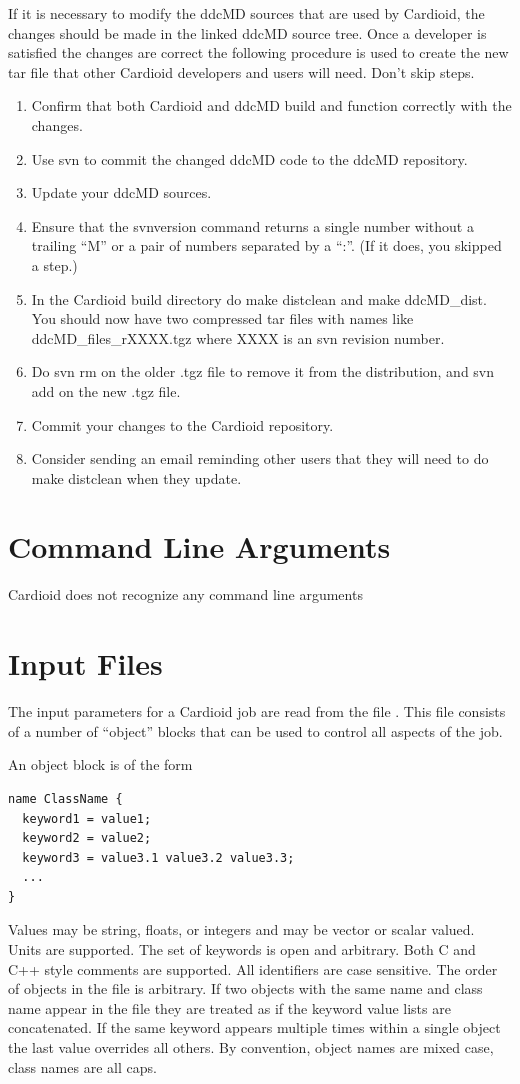 \documentclass{article}
\begin{document}
If it is necessary to modify the ddcMD sources that are used by
Cardioid, the changes should be made in the linked ddcMD source tree.
Once a developer is satisfied the changes are correct the following
procedure is used to create the new tar file that other Cardioid
developers and users will need.  Don't skip steps.
\begin{enumerate}
\item Confirm that both Cardioid and ddcMD build and function correctly
  with the changes.
\item Use svn to commit the changed ddcMD code to the ddcMD repository.
\item Update your ddcMD sources.  
\item Ensure that the svnversion command returns a single number without
  a trailing ``M'' or a pair of numbers separated by a ``:''.  (If it
  does, you skipped a step.)
\item In the Cardioid build directory do make distclean and make
  ddcMD\_dist.  You should now have two compressed tar files with names
  like ddcMD\_files\_rXXXX.tgz where XXXX is an svn revision number.
\item Do svn rm on the older .tgz file to remove it from the
  distribution, and svn add on the new .tgz file.  
\item Commit your changes to the Cardioid repository.
\item Consider sending an email reminding other users that they will
  need to do make distclean when they update.
\end{enumerate}

\section{Command Line Arguments}

Cardioid does not recognize any command line arguments

\section{Input Files}

The input parameters for a Cardioid job are read from the file
.  This file consists of a number of ``object'' blocks
that can be used to control all aspects of the job.

An object block is of the form
\begin{verbatim}
name ClassName { 
  keyword1 = value1; 
  keyword2 = value2;
  keyword3 = value3.1 value3.2 value3.3;
  ...
}
\end{verbatim}
Values may be string, floats, or integers and may be vector or scalar
valued.  Units are supported.  The set of keywords is open and
arbitrary.  Both C and C++ style comments are supported.  All
identifiers are case sensitive.  The order of objects in the file is
arbitrary.  If two objects with the same name and class name appear in
the file they are treated as if the keyword value lists are
concatenated.  If the same keyword appears multiple times within a
single object the last value overrides all others.  By convention,
object names are mixed case, class names are all caps.
\end{document}
